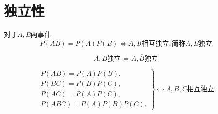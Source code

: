 \documentclass[main.tex]{subfiles}
\begin{document}
\section{独立性}
\begin{define}[独立]\label{独立}\label{相互独立}
    对于$A, B$两事件
    \[ P(AB) = P(A)P(B) \Leftrightarrow A, B \text{相互独立}, \text{简称} A, B \text{独立} \]
\end{define}
\begin{mthm}
    \[ A, B \text{独立} \Leftrightarrow A, \bar{B} \text{独立} \]
\end{mthm}
\begin{define}[多事件独立]
    \[
        \left.
            \begin{array}{l}
                P(AB) = P(A)P(B), \\
                P(BC) = P(B)P(C), \\
                P(AC) = P(A)P(C), \\
                P(ABC) = P(A)P(B)P(C).
            \end{array}
        \right\}
        \Leftrightarrow{}
        A, B, C \text{相互独立}
    \]
\end{define}
\end{document}
